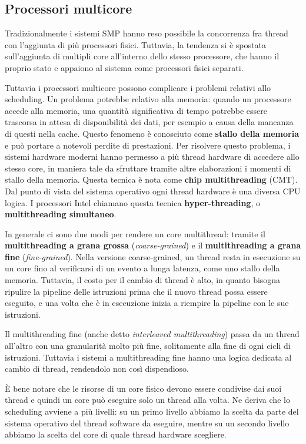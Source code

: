     \subsection{Processori multicore}
        Tradizionalmente i sistemi SMP hanno reso possibile la concorrenza fra thread con l'aggiunta di più processori fisici. Tuttavia, la tendenza si è spostata sull'aggiunta di multipli core all'interno dello stesso processore, che hanno il proprio stato e appaiono al sistema come processori fisici separati.
        
        Tuttavia i processori multicore possono complicare i problemi relativi allo scheduling. Un problema potrebbe relativo alla memoria: quando un processore accede alla memoria, una quantità significativa di tempo potrebbe essere trascorsa in attesa di disponibilità dei dati, per esempio a causa della mancanza di questi nella cache. Questo fenomeno è conosciuto come \textbf{stallo della memoria} e può portare a notevoli perdite di prestazioni. Per risolvere questo problema, i sistemi hardware moderni hanno permesso a più thread hardware di accedere allo stesso core, in maniera tale da sfruttare tramite altre elaborazioni i momenti di stallo della memoria. Questa tecnica è nota come \textbf{chip multithreading} (CMT). Dal punto di vista del sistema operativo ogni thread hardware è una diversa CPU logica. I processori Intel chiamano questa tecnica \textbf{hyper-threading}, o \textbf{multithreading simultaneo}.
        
        In generale ci sono due modi per rendere un core multithread: tramite il \textbf{multithreading a grana grossa} (\textit{coarse-grained}) e il \textbf{multithreading a grana fine} (\textit{fine-grained}). Nella versione coarse-grained, un thread resta in esecuzione su un core fino al verificarsi di un evento a lunga latenza, come uno stallo della memoria. Tuttavia, il costo per il cambio di thread è alto, in quanto bisogna ripulire la pipeline delle istruzioni prima che il nuovo thread possa essere eseguito, e una volta che è in esecuzione inizia a riempire la pipeline con le sue istruzioni.
        
        Il multithreading fine (anche detto \textit{interleaved multithreading}) passa da un thread all'altro con una granularità molto più fine, solitamente alla fine di ogni cicli di istruzioni. Tuttavia i sistemi a multithreading fine hanno una logica dedicata al cambio di thread, rendendolo non così dispendioso.
        
        È bene notare che le risorse di un core fisico devono essere condivise dai suoi thread e quindi un core può eseguire solo un thread alla volta. Ne deriva che lo scheduling avviene a più livelli: su un primo livello abbiamo la scelta da parte del sistema operativo del thread software da eseguire, mentre su un secondo livello abbiamo la scelta del core di quale thread hardware scegliere.
        
